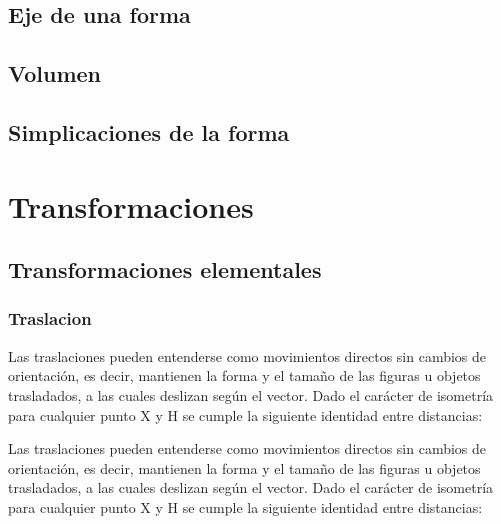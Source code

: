 \section{Eje de una forma}

\section{Volumen}

\section{Simplicaciones de la forma}


\chapter{Transformaciones}

\section{Transformaciones elementales}
\subsection{Traslacion}

Las traslaciones pueden entenderse como movimientos directos sin cambios de orientación, es decir, mantienen la forma y el tamaño de las figuras u objetos trasladados, a las cuales deslizan según el vector. Dado el carácter de isometría para cualquier punto X y H se cumple la siguiente identidad entre distancias:

Las traslaciones pueden entenderse como movimientos directos sin cambios de orientación, es decir, mantienen la forma y el tamaño de las figuras u objetos trasladados, a las cuales deslizan según el vector. Dado el carácter de isometría para cualquier punto X y H se cumple la siguiente identidad entre distancias:

